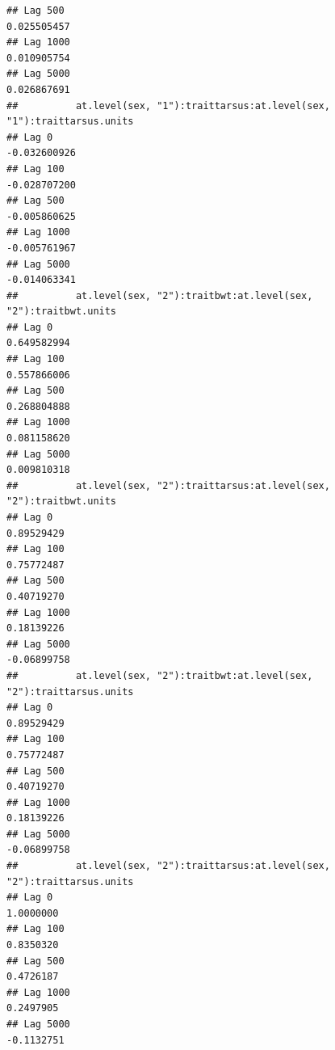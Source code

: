 \documentclass[
  12pt,
]{book}
\begin{document}
\begin{verbatim}
## Lag 500                                                       0.025505457
## Lag 1000                                                      0.010905754
## Lag 5000                                                      0.026867691
##          at.level(sex, "1"):traittarsus:at.level(sex, "1"):traittarsus.units
## Lag 0                                                           -0.032600926
## Lag 100                                                         -0.028707200
## Lag 500                                                         -0.005860625
## Lag 1000                                                        -0.005761967
## Lag 5000                                                        -0.014063341
##          at.level(sex, "2"):traitbwt:at.level(sex, "2"):traitbwt.units
## Lag 0                                                      0.649582994
## Lag 100                                                    0.557866006
## Lag 500                                                    0.268804888
## Lag 1000                                                   0.081158620
## Lag 5000                                                   0.009810318
##          at.level(sex, "2"):traittarsus:at.level(sex, "2"):traitbwt.units
## Lag 0                                                          0.89529429
## Lag 100                                                        0.75772487
## Lag 500                                                        0.40719270
## Lag 1000                                                       0.18139226
## Lag 5000                                                      -0.06899758
##          at.level(sex, "2"):traitbwt:at.level(sex, "2"):traittarsus.units
## Lag 0                                                          0.89529429
## Lag 100                                                        0.75772487
## Lag 500                                                        0.40719270
## Lag 1000                                                       0.18139226
## Lag 5000                                                      -0.06899758
##          at.level(sex, "2"):traittarsus:at.level(sex, "2"):traittarsus.units
## Lag 0                                                              1.0000000
## Lag 100                                                            0.8350320
## Lag 500                                                            0.4726187
## Lag 1000                                                           0.2497905
## Lag 5000                                                          -0.1132751
\end{verbatim}
\end{document}
